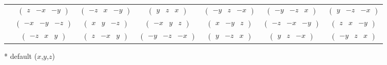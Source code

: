 \documentclass[fleqn,9pt,landscape]{jsarticle}
\begin{document}
\begin{center}
\begin{longtable}{ccccccc}
& $ \begin{pmatrix} z & - x & - y \end{pmatrix} $ & $ \begin{pmatrix} - z & x & - y \end{pmatrix} $ & $ \begin{pmatrix} y & z & x \end{pmatrix} $ & $ \begin{pmatrix} - y & z & - x \end{pmatrix} $ & $ \begin{pmatrix} - y & - z & x \end{pmatrix} $ & $ \begin{pmatrix} y & - z & - x \end{pmatrix} $ \\
& $ \begin{pmatrix} - x & - y & - z \end{pmatrix} $ & $ \begin{pmatrix} x & y & - z \end{pmatrix} $ & $ \begin{pmatrix} - x & y & z \end{pmatrix} $ & $ \begin{pmatrix} x & - y & z \end{pmatrix} $ & $ \begin{pmatrix} - z & - x & - y \end{pmatrix} $ & $ \begin{pmatrix} z & x & - y \end{pmatrix} $ \\
& $ \begin{pmatrix} - z & x & y \end{pmatrix} $ & $ \begin{pmatrix} z & - x & y \end{pmatrix} $ & $ \begin{pmatrix} - y & - z & - x \end{pmatrix} $ & $ \begin{pmatrix} y & - z & x \end{pmatrix} $ & $ \begin{pmatrix} y & z & - x \end{pmatrix} $ & $ \begin{pmatrix} - y & z & x \end{pmatrix} $ \\
\end{longtable}
\end{center}
* default ($x$,$y$,$z$)
\end{document}
